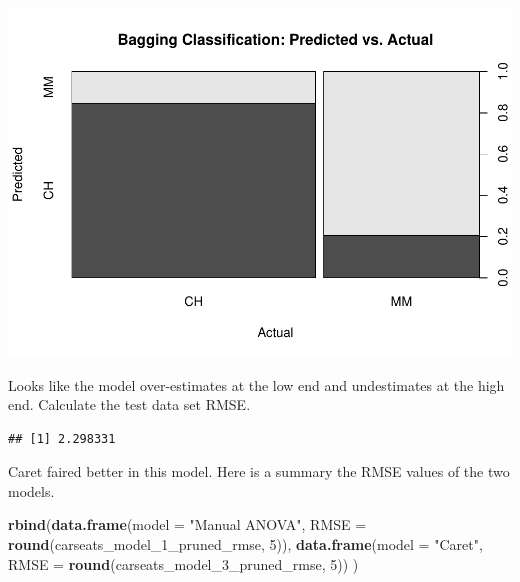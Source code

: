 \documentclass[
]{book}
\newenvironment{Shaded}{\begin{snugshade}}{\end{snugshade}}
\newcommand{\DataTypeTok}[1]{\textcolor[rgb]{0.13,0.29,0.53}{#1}}
\newcommand{\DecValTok}[1]{\textcolor[rgb]{0.00,0.00,0.81}{#1}}
\newcommand{\KeywordTok}[1]{\textcolor[rgb]{0.13,0.29,0.53}{\textbf{#1}}}
\newcommand{\NormalTok}[1]{#1}
\newcommand{\OperatorTok}[1]{\textcolor[rgb]{0.81,0.36,0.00}{\textbf{#1}}}
\newcommand{\StringTok}[1]{\textcolor[rgb]{0.31,0.60,0.02}{#1}}
\begin{document}
\includegraphics{data-sci_files/figure-latex/unnamed-chunk-80-1.pdf}

Looks like the model over-estimates at the low end and undestimates at the high end. Calculate the test data set RMSE.

\begin{Shaded}
\end{Shaded}

\begin{verbatim}
## [1] 2.298331
\end{verbatim}

Caret faired better in this model. Here is a summary the RMSE values of the two models.

\begin{Shaded}
\begin{Highlighting}[]
\KeywordTok{rbind}\NormalTok{(}\KeywordTok{data.frame}\NormalTok{(}\DataTypeTok{model =} \StringTok{"Manual ANOVA"}\NormalTok{, }
                 \DataTypeTok{RMSE =} \KeywordTok{round}\NormalTok{(carseats_model_}\DecValTok{1}\NormalTok{_pruned_rmse, }\DecValTok{5}\NormalTok{)), }
      \KeywordTok{data.frame}\NormalTok{(}\DataTypeTok{model =} \StringTok{"Caret"}\NormalTok{, }
                 \DataTypeTok{RMSE =} \KeywordTok{round}\NormalTok{(carseats_model_}\DecValTok{3}\NormalTok{_pruned_rmse, }\DecValTok{5}\NormalTok{))}
\NormalTok{)}
\end{Highlighting}
\end{Shaded}
\end{document}

